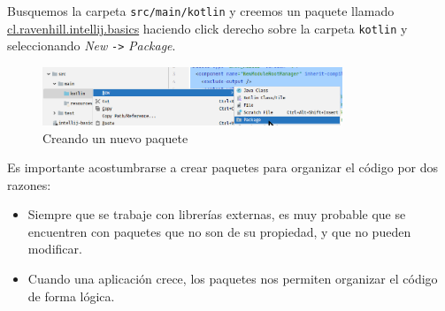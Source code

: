   Busquemos la carpeta \texttt{src/main/kotlin} y creemos un paquete llamado 
  \url{cl.ravenhill.intellij.basics} haciendo click derecho sobre la carpeta \texttt{kotlin} y 
  seleccionando \textit{New} \texttt{->} \textit{Package}.

  \begin{figure}[ht!]
    \centering
    \includegraphics[width=0.8\textwidth]{img/Por_algo_se_empieza/idea64_new_package.png}
    \caption{Creando un nuevo paquete}
    \label{fig:idea64_new_package}
  \end{figure}

  Es importante acostumbrarse a crear paquetes para organizar el código por dos razones:
  \begin{itemize}
    \item Siempre que se trabaje con librerías externas, es muy probable que se encuentren con 
      paquetes que no son de su propiedad, y que no pueden modificar.
    \item Cuando una aplicación crece, los paquetes nos permiten organizar el código de forma 
      lógica.
  \end{itemize}